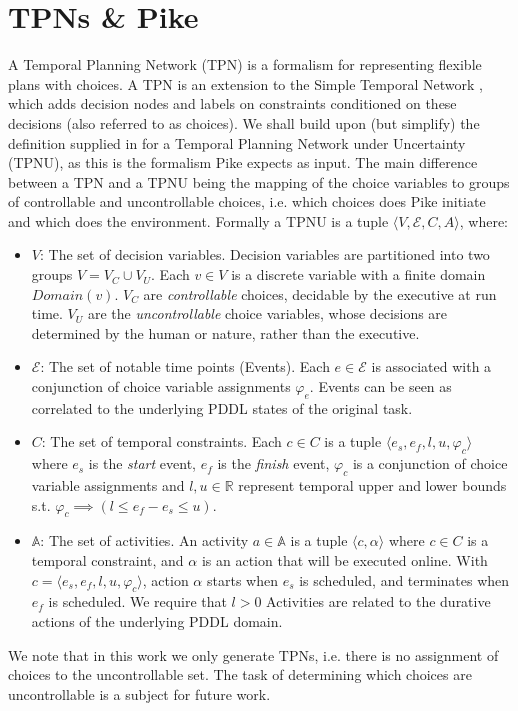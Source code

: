 \section{TPNs \& Pike}
\label{background: tpns and Pike}

A Temporal Planning Network (TPN) is a formalism for representing flexible plans with choices. A TPN is an extension to the Simple Temporal Network \cite{dechter1991temporal}, which adds decision nodes and labels on constraints conditioned on these decisions (also referred to as choices). 
We shall build upon (but simplify) the definition supplied in \cite{levine2018watching} for a Temporal Planning Network under Uncertainty (TPNU), as this is the formalism Pike expects as input. The main difference between a TPN and a TPNU being the mapping of the choice variables to groups of controllable and uncontrollable choices, i.e. which choices does Pike initiate and which does the environment. Formally a TPNU is a tuple $\langle V, \mathcal{E}, C, A\rangle$, where:
\begin{itemize}
    \item $V$: The set of decision variables.
    Decision variables are partitioned into two groups $V = V_C \cup V_U$.
    Each $v \in V$ is a discrete variable with a finite domain $Domain(v)$. $V_C$ are \textit{controllable}
    choices, decidable by the executive at run time. $V_U$ are the \textit{uncontrollable} choice variables, whose decisions are determined by the human or nature, rather than the executive.
    
    \item $\mathcal{E}$: The set of notable time points (Events).
    Each $e \in \mathcal{E}$ is associated with a conjunction of choice variable assignments $\varphi_e$. 
    Events can be seen as correlated to the underlying PDDL states of the original task.
    
    \item $C$: The set of temporal constraints. Each $c \in C$ is a tuple $\langle e_s, e_f, l, u, \varphi_c \rangle$ where $e_s$ is the \textit{start} event, $e_f$ is the \textit{finish} event, $\varphi_c$ is a conjunction of choice variable assignments and $l,u \in \mathbb{R}$  represent temporal upper and lower bounds s.t. $\varphi_c \implies (l\leq e_f - e_s \leq u)$. 
    
    \item $\mathbb{A}$: The set of activities. An activity $a \in \mathbb{A}$ is a tuple $\langle c,\alpha \rangle$ where $c \in C$ is a temporal constraint, and $\alpha$ is an action that will be executed online. With $c = \langle e_s, e_f, l, u, \varphi_c \rangle$, action $\alpha$ starts when $e_s$ is scheduled, and terminates when $e_f$ is scheduled. We require that $l >0$
    Activities are related to the durative actions of the underlying PDDL domain.
    
\end{itemize}
We note that in this work we only generate TPNs, i.e. there is no assignment of choices to the uncontrollable set. The task of determining which choices are uncontrollable is a subject for future work.

